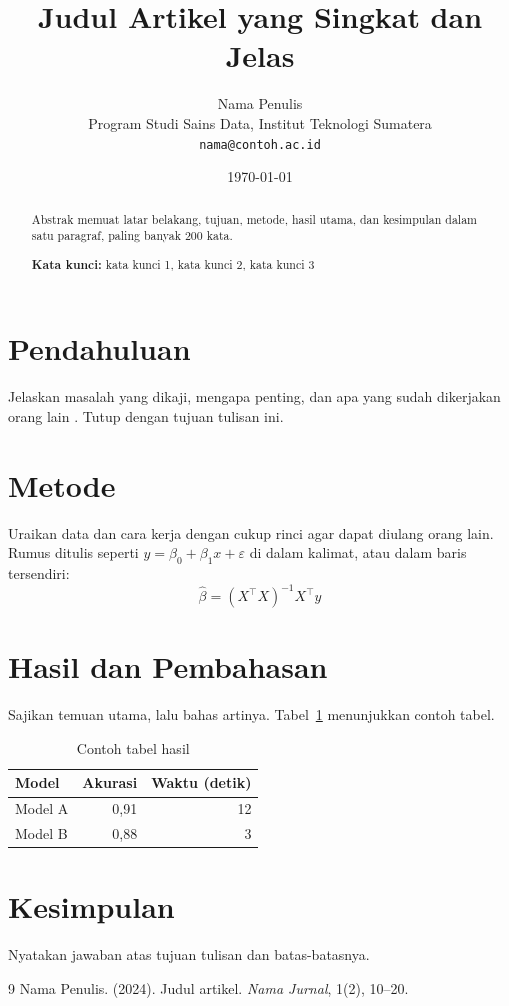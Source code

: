\documentclass[11pt,a4paper]{article}
\title{Judul Artikel yang Singkat dan Jelas}
\author{Nama Penulis\\
	\small Program Studi Sains Data, Institut Teknologi Sumatera\\
	\small \texttt{nama@contoh.ac.id}}
\date{\today}
\begin{document}
\maketitle

\begin{abstract}
	Abstrak memuat latar belakang, tujuan, metode, hasil utama, dan kesimpulan dalam satu
	paragraf, paling banyak 200 kata.

	\medskip
	\noindent\textbf{Kata kunci:} kata kunci 1, kata kunci 2, kata kunci 3
\end{abstract}

\section{Pendahuluan}
Jelaskan masalah yang dikaji, mengapa penting, dan apa yang sudah dikerjakan orang lain
\cite{penulis2024}. Tutup dengan tujuan tulisan ini.

\section{Metode}
Uraikan data dan cara kerja dengan cukup rinci agar dapat diulang orang lain. Rumus
ditulis seperti $y = \beta_0 + \beta_1 x + \varepsilon$ di dalam kalimat, atau dalam
baris tersendiri:
\begin{equation}
	\hat{\beta} = (X^{\top} X)^{-1} X^{\top} y
	\label{eq:ols}
\end{equation}

\section{Hasil dan Pembahasan}
Sajikan temuan utama, lalu bahas artinya. Tabel~\ref{tab:hasil} menunjukkan contoh
tabel.
\begin{table}[htbp]
	\centering
	\caption{Contoh tabel hasil}
	\label{tab:hasil}
	\begin{tabular}{lrr}
		\toprule
		Model     & Akurasi & Waktu (detik) \\
		\midrule
		Model A   & 0{,}91  & 12 \\
		Model B   & 0{,}88  & 3 \\
		\bottomrule
	\end{tabular}
\end{table}

\section{Kesimpulan}
Nyatakan jawaban atas tujuan tulisan dan batas-batasnya.

\begin{thebibliography}{9}
	 Nama Penulis. (2024). Judul artikel. \textit{Nama Jurnal}, 1(2), 10--20.
\end{thebibliography}
\end{document}
